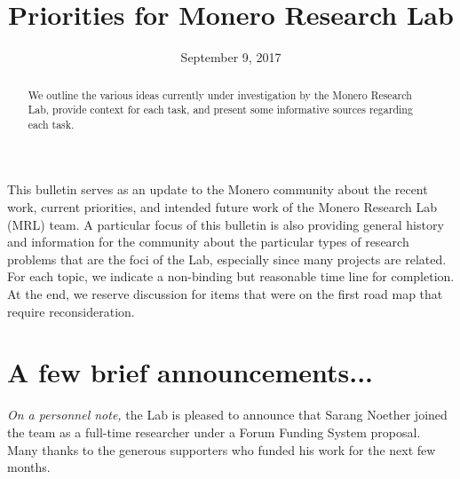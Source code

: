 \documentclass[12pt,english]{mrl}
\theoremstyle{definition}
\numberwithin{equation}{section}
\numberwithin{figure}{section}
\numberwithin{equation}{section}
\numberwithin{equation}{section}
\numberwithin{figure}{section}
\begin{document}
\begin{frontmatter}

\begin{fmbox}
\hfill\setlength{\fboxrule}{0px}\setlength{\fboxsep}{5px}
\title{Priorities for Monero Research Lab}
\date{September 9, 2017}
\author[
   addressref={mrl},
   email={bggoode@g.clemson.edu}
]{ }
\author[
   addressref={mrl},
   email={sarang.noether@protonmail.com}
]{ }


\address[id=mrl]{
}
\end{fmbox}

\begin{abstractbox}
\begin{abstract}
We outline the various ideas currently under investigation by the Monero Research Lab, provide context for each task, and present some informative sources regarding each task. \end{abstract}
\end{abstractbox}
\end{frontmatter}


This bulletin serves as an update to the Monero community about the recent work, current priorities, and intended future work of the Monero Research Lab (MRL) team. A particular focus of this bulletin is also providing general history and information for the community about the particular types of research problems that are the foci of the Lab, especially since many projects are related. For each topic, we indicate a non-binding but reasonable time line for completion. At the end, we reserve discussion for items that were on the first road map that require reconsideration.

\section{A few brief announcements...}

\textit{On a personnel note,} the Lab is pleased to announce that Sarang Noether joined the team as a full-time researcher under a Forum Funding System proposal. Many thanks to the generous supporters who funded his work for the next few months.
\end{document}
